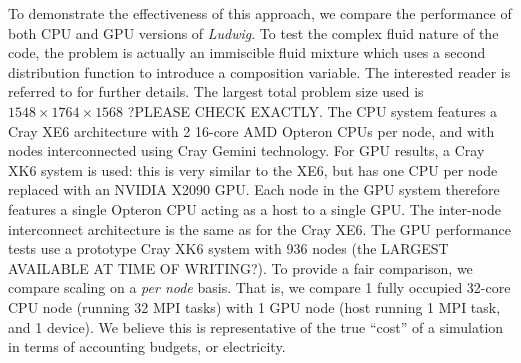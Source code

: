 
To demonstrate the effectiveness of this approach, we compare the
performance of both CPU and GPU versions of \textit{Ludwig}. To
test the complex fluid nature of the code, the problem is
actually an immiscible fluid mixture which uses a second distribution
function to introduce a composition variable. The interested reader
is referred to \cite{ch14:stratford-jsp2005} for further details. The
largest total problem size used is $1548\times 1764\times 1568$ ?PLEASE CHECK EXACTLY.
The CPU system features a Cray XE6 architecture with 2 16-core AMD Opteron
CPUs per node, and with nodes interconnected using Cray Gemini technology.
For GPU results, a Cray XK6 system is used: this is very similar to the
XE6, but has one CPU per node replaced with an NVIDIA X2090 GPU. Each
node in the GPU system therefore features a single Opteron CPU acting
as a host to a single GPU. The inter-node interconnect architecture is
the same as for the Cray XE6. The GPU performance tests use a prototype
Cray XK6 system with 936 nodes (the LARGEST AVAILABLE AT TIME OF WRITING?).
To provide a fair comparison, we compare scaling on a \textit{per node}
basis. That is, we compare 1 fully occupied 32-core CPU node
(running 32 MPI tasks) with 1 GPU node (host running 1 MPI task,
and 1 device). We believe this is representative of the true ``cost'' of
a simulation in terms of accounting budgets, or electricity.



